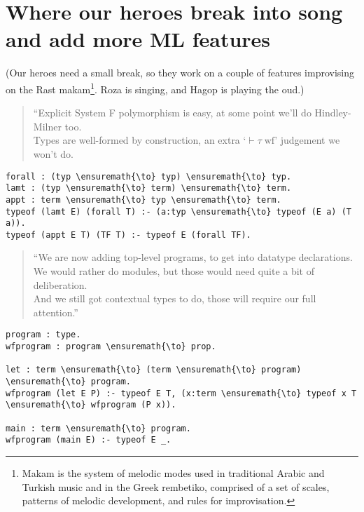 \section{Where our heroes break into song and add more ML
features}\label{where-our-heroes-break-into-song-and-add-more-ml-features}

\begin{scenecomment}
(Our heroes need a small break, so they work on a couple of features improvising on the Rast makam\footnote{Makam is the system of melodic modes used in traditional Arabic and Turkish music and in the Greek rembetiko, comprised of a set of scales, patterns of melodic development, and rules for improvisation.}. Roza is singing, and Hagop is playing the oud.)
\end{scenecomment}

\begin{verse}
``Explicit System F polymorphism is easy, at some point we'll do Hindley-Milner too. \\
Types are well-formed by construction, an extra `$\vdash \tau \; \text{wf}$' judgement we won't do.
\end{verse}

\begin{verbatim}
forall : (typ \ensuremath{\to} typ) \ensuremath{\to} typ.
lamt : (typ \ensuremath{\to} term) \ensuremath{\to} term.
appt : term \ensuremath{\to} typ \ensuremath{\to} term.
typeof (lamt E) (forall T) :- (a:typ \ensuremath{\to} typeof (E a) (T a)).
typeof (appt E T) (TF T) :- typeof E (forall TF).
\end{verbatim}

\begin{verse}
``We are now adding top-level programs, to get into datatype declarations. \\
We would rather do modules, but those would need quite a bit of deliberation. \\
And we still got contextual types to do, those will require our full attention.''
\end{verse}

\begin{verbatim}
program : type.
wfprogram : program \ensuremath{\to} prop.

let : term \ensuremath{\to} (term \ensuremath{\to} program) \ensuremath{\to} program.
wfprogram (let E P) :- typeof E T, (x:term \ensuremath{\to} typeof x T \ensuremath{\to} wfprogram (P x)).

main : term \ensuremath{\to} program.
wfprogram (main E) :- typeof E _.
\end{verbatim}

